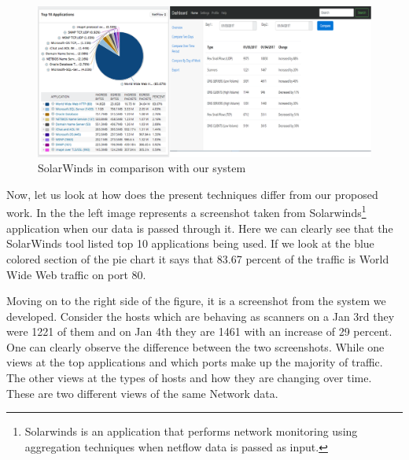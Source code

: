 \begin{figure}[b]
	\centerline{\includegraphics[scale = 0.6]{intro.png}}
	\caption{SolarWinds in comparison with our system}%
\end{figure}

Now, let us look at how does the present techniques differ from our proposed work. In the  the left image represents a screenshot taken from Solarwinds\footnote{Solarwinds is an application that performs network monitoring using aggregation techniques when netflow data is passed as input.} application when our data is passed through it. Here we can clearly see that the SolarWinds tool listed top 10 applications being used. If we look at the blue colored section of the pie chart it says that 83.67 percent of the traffic is World Wide Web traffic on port 80. 

Moving on to the right side of the figure, it is a screenshot from the system we developed. Consider the hosts which are behaving as scanners on a Jan 3rd they were 1221 of them and on Jan 4th they are 1461 with an increase of 29 percent. One can clearly observe the difference between the two screenshots. While one views at the top applications and which ports make up the majority of traffic. The other views at the types of hosts and how they are changing over time. These are two different views of the same Network data.

